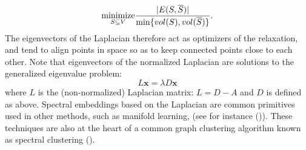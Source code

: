 \[
    \underset{S  \subseteq V }{\text{minimize}} {|E(S,\overline{S})|\over \min\{vol(S), vol(\overline{S})\}}.
\]
The eigenvectors of the Laplacian therefore act as optimizers of the relaxation, and tend to align points in space so as to keep connected points close to each other. Note that eigenvectors of the normalized Laplacian are solutions to the generalized eigenvalue problem:
\[
    L\mathbf{x} = \lambda D\mathbf{x}
\]
where $L$ is the (non-normalized) Laplacian matrix: $L = D-A$ and $D$ is defined as above. Spectral embeddings based on the Laplacian are common primitives used in other methods, such as manifold learning, (see for instance (\cite{belkin2003laplacian})). These techniques are also at the heart of a common graph clustering algorithm known as spectral clustering (\cite{ng2002spectral}).

